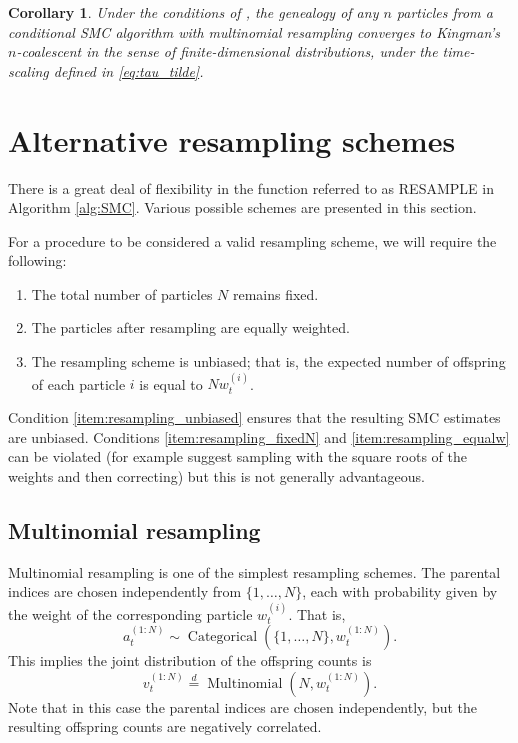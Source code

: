 \documentclass[fleqn]{article}
\newtheorem{corollary}{Corollary}
\theoremstyle{definition}
\newcommand{\eqdist}{\overset{d}{=}}
\newcommand{\Cat}{\operatorname{Categorical}}
\newcommand{\vt}[2][t]{v_{#1}^{(#2)}}
\newcommand{\wt}[2][t]{w_{#1}^{(#2)}}
\begin{document}
\begin{corollary}\label{thm:condSMC_kingman}
Under the conditions of \citet[Lemma 3]{koskela2018}, the genealogy of any $n$ particles from a conditional SMC algorithm with multinomial resampling converges to Kingman's $n$-coalescent in the sense of finite-dimensional distributions, under the time-scaling defined in \eqref{eq:tau_tilde}.
\end{corollary}


\section{Alternative resampling schemes}\label{sec:resampling}
There is a great deal of flexibility in the function referred to as {\footnotesize RESAMPLE} in Algorithm \ref{alg:SMC}.
Various possible schemes are presented in this section.

For a procedure to be considered a valid resampling scheme, we will require the following:
\begin{enumerate}
\item The total number of particles $N$ remains fixed. \label{item:resampling_fixedN}
\item The particles after resampling are equally weighted. \label{item:resampling_equalw}
\item The resampling scheme is unbiased; that is, the expected number of offspring of each particle $i$ is equal to $N\wt{i}$. \label{item:resampling_unbiased}
\end{enumerate}
Condition \ref{item:resampling_unbiased} ensures that the resulting SMC estimates are unbiased. 
Conditions \ref{item:resampling_fixedN} and \ref{item:resampling_equalw} can be violated (for example \citet{liu1998} suggest sampling with the square roots of the weights and then correcting) but this is not generally advantageous.

\subsection{Multinomial resampling}
Multinomial resampling \citep{efron1994} is one of the simplest resampling schemes.
The parental indices are chosen independently from $\{1, \dots, N\}$, each with probability given by the weight of the corresponding particle $\wt{i}$. 
That is, 
\begin{equation*}
a_t^{(1:N)} \sim \Cat(\{1,\dots, N\}, \wt{1:N}) .
\end{equation*}
This implies the joint distribution of the offspring counts is 
\begin{equation*}
\vt{1:N} \eqdist \operatorname{Multinomial}(N, \wt{1:N}) .
\end{equation*}
Note that in this case the parental indices are chosen independently, but the resulting offspring counts are negatively correlated.
\end{document}
